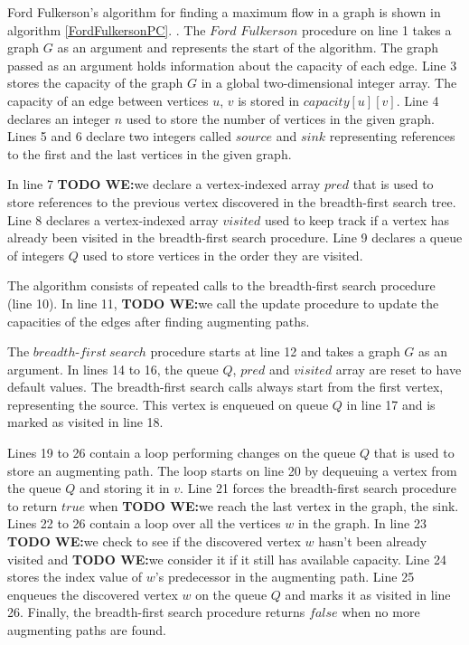 \documentclass{l4proj}
\begin{document}
\noindent Ford Fulkerson's algorithm for finding a maximum flow in a graph is shown in algorithm \ref{FordFulkersonPC}. \cite{ford1956maximal}. The $Ford$ $Fulkerson$ procedure on line 1 takes a graph $G$ as an argument and represents the start of the algorithm. The graph passed as an argument holds information about the capacity of each edge. Line 3 stores the capacity of the graph $G$ in a global two-dimensional integer array. The capacity of an edge between vertices $u$, $v$ is stored in $capacity[u][v]$. Line 4 declares an integer $n$ used to store the number of vertices in the given graph. Lines 5 and 6 declare two integers called $source$ and $sink$ representing references to the first and the last vertices in the given graph.

\noindent In line 7 \textbf{TODO WE:}we declare a vertex-indexed array $pred$ that is used to store references to the previous vertex discovered in the breadth-first search tree. Line 8 declares a vertex-indexed array $visited$ used to keep track if a vertex has already been visited in the breadth-first search procedure. Line 9 declares a queue of integers $Q$ used to store vertices in the order they are visited.

\noindent The algorithm consists of repeated calls to the breadth-first search procedure (line 10). In line 11, \textbf{TODO WE:}we call the update procedure to update the capacities of the edges after finding augmenting paths.

\noindent The $breadth\textit{-}first ~ search$ procedure starts at line 12 and takes a graph $G$ as an argument. In lines 14 to 16, the queue $Q$, $pred$ and $visited$ array are reset to have default values. The breadth-first search calls always start from the first vertex, representing the source. This vertex is enqueued on queue $Q$ in line 17 and is marked as visited in line 18.

\noindent Lines 19 to 26 contain a loop performing changes on the queue $Q$ that is used to store an augmenting path. The loop starts on line 20 by dequeuing a vertex from the queue $Q$ and storing it in $v$. Line 21 forces the breadth-first search procedure to return $true$ when \textbf{TODO WE:}we reach the last vertex in the graph, the sink. Lines 22 to 26 contain a loop over all the vertices $w$ in the graph. In line 23 \textbf{TODO WE:}we check to see if the discovered vertex $w$ hasn't been already visited and \textbf{TODO WE:}we consider it if it still has available capacity. Line 24 stores the index value of $w$'s predecessor in the augmenting path. Line 25 enqueues the discovered vertex $w$ on the queue $Q$ and marks it as visited in line 26. Finally, the breadth-first search procedure returns $false$ when no more augmenting paths are found.
\end{document}
